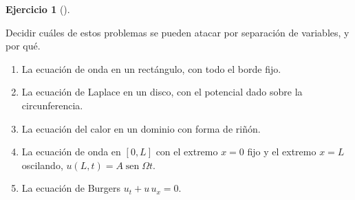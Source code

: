 \documentclass[
  spanish,
  a4paper,
]{scrbook}
\providecommand{\tightlist}{%
  \setlength{\itemsep}{0pt}\setlength{\parskip}{0pt}}
\theoremstyle{definition}
\theoremstyle{plain}
\theoremstyle{definition}
\theoremstyle{plain}
\theoremstyle{definition}
\newtheorem{exercise}{Ejercicio}[chapter]
\theoremstyle{remark}
\begin{document}
\begin{exercise}[]\protect\hypertarget{exr-separacion-requisitos}{}\label{exr-separacion-requisitos}

Decidir cuáles de estos problemas se pueden atacar por separación de
variables, y por qué.

\begin{enumerate}
\def\labelenumi{\alph{enumi}.}
\tightlist
\item
  La ecuación de onda en un rectángulo, con todo el borde fijo.
\item
  La ecuación de Laplace en un disco, con el potencial dado sobre la
  circunferencia.
\item
  La ecuación del calor en un dominio con forma de riñón.
\item
  La ecuación de onda en \([0,L]\) con el extremo \(x=0\) fijo y el
  extremo \(x=L\) oscilando, \(u(L,t) = A\operatorname{sen}\Omega t\).
\item
  La ecuación de Burgers \(u_t + u\,u_x = 0\).
\end{enumerate}

\end{exercise}
\end{document}
